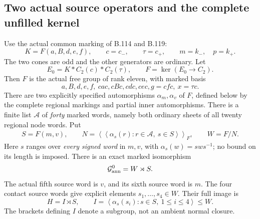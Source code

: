 \subsection*{Two actual source operators and the complete unfilled kernel}

\label{stmt:B123}
Use the actual common marking of B.114 and B.119:
\[
 K=F(a,B,d,e,f),\qquad c=c_-,\qquad \tau=c_+,\qquad
 m=k_-,\quad p=k_+.
\]
The two cones are odd and the other generators are ordinary.
Let
\begin{equation}\label{eq:B123-generic-fiber}
 E_0=K*C_2(c)*C_2(\tau),\qquad
 F=\ker(E_0\longrightarrow C_2).
\end{equation}
Then $F$ is the actual free group of rank eleven, with marked basis
\begin{equation}\label{eq:B123-free-eleven}
 a,B,d,e,f,\ cac,cBc,cdc,cec,g=cfc,\ x=\tau c.
\end{equation}
There are two explicitly specified automorphisms $\alpha_m,\alpha_v$
of $F$, defined below by the complete regional markings and partial
inner automorphisms. There is a finite list $\mathcal A$ of
\emph{forty} marked words, namely both ordinary sheets of all twenty
regional node words. Put
\begin{equation}\label{eq:B123-whole-closure}
 \begin{gathered}
 S=F(m,v),\qquad
 N=\left\langle\!\left\langle
       \alpha_s(r):r\in\mathcal A,\ s\in S
       \right\rangle\!\right\rangle_F,\qquad W=F/N.
 \end{gathered}
\end{equation}
Here $s$ ranges over \emph{every signed word} in $m,v$, with
$\alpha_s(w)=sws^{-1}$; no bound on its length is imposed.
There is an exact marked isomorphism
\begin{equation}\label{eq:B123-actual-splitting}
 \mathcal G^0_{\rm ann}=W\rtimes S.
\end{equation}
The actual fifth source word is $v$, and its sixth source word is
$m$. The four contact source words give explicit elements
$s_1,\ldots,s_4\in W$. Their full image is
\begin{equation}\label{eq:B123-source-orbit}
 H=I\rtimes S,\qquad
 I=\left\langle\alpha_s(s_i):s\in S,\ 1\leq i\leq4\right\rangle
       \leq W.
\end{equation}
The brackets defining $I$ denote a subgroup, not an ambient normal
closure.

